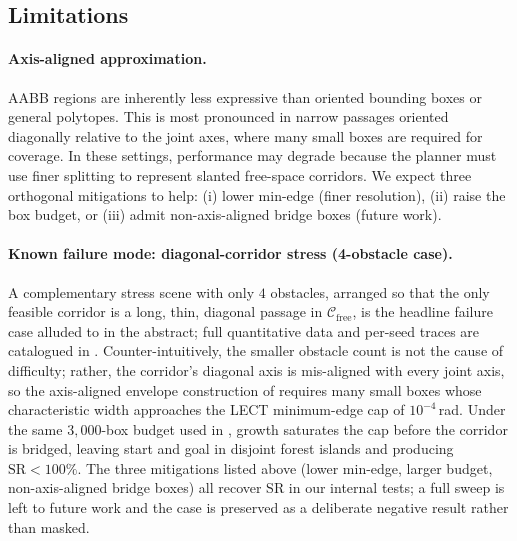 \documentclass[journal]{IEEEtran}
\begin{document}
\subsection{Limitations}

\paragraph{Axis-aligned approximation.}
AABB regions are inherently less expressive than oriented bounding
boxes or general polytopes. This is most pronounced in narrow passages
oriented diagonally relative to the joint axes, where many small boxes
are required for coverage. In these settings, performance may degrade
because the planner must use finer splitting to represent slanted
free-space corridors. We expect three orthogonal mitigations to help:
(i) lower min-edge (finer resolution), (ii) raise the box budget, or
(iii) admit non-axis-aligned bridge boxes (future work).

\paragraph{Known failure mode: diagonal-corridor stress (4-obstacle case).}
A complementary stress scene with only $4$ obstacles, arranged so
that the only feasible corridor is a long, thin, diagonal passage in
$\mathcal{C}_\text{free}$, is the headline failure case alluded to in
the abstract; full quantitative data and per-seed traces are
catalogued in . Counter-intuitively, the smaller obstacle count is not
the cause of difficulty; rather, the corridor's diagonal axis is
mis-aligned with every joint axis, so the axis-aligned envelope
construction of  requires many small boxes whose
characteristic width approaches the LECT minimum-edge cap of
$10^{-4}$\,rad. Under the same $3{,}000$-box budget used in
, growth saturates the cap before the corridor
is bridged, leaving start and goal in disjoint forest islands and
producing $\text{SR}<100\%$. The three mitigations listed above
(lower min-edge, larger budget, non-axis-aligned bridge boxes) all
recover SR in our internal tests; a full sweep is left to future
work and the case is preserved as a deliberate negative result
rather than masked.
\end{document}
